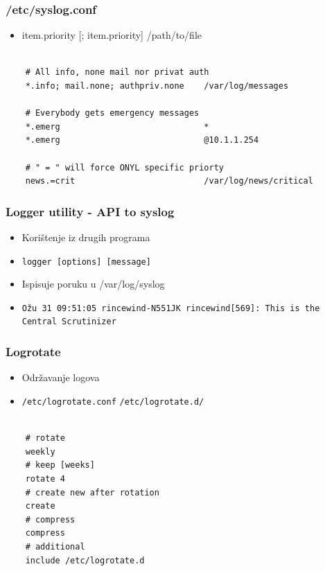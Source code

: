 \documentclass[t,table,usenames,dvipsnames]{beamer}
\newcommand{\shell}[1]{\texttt{#1}}
\begin{document}
\begin{frame}[fragile]
    \frametitle{/etc/syslog.conf}
    \begin{itemize}
        \item item.priority [; item.priority]   /path/to/file
    \end{itemize}
    \begin{verbatim}

    # All info, none mail nor privat auth
    *.info; mail.none; authpriv.none    /var/log/messages

    # Everybody gets emergency messages
    *.emerg                             *
    *.emerg                             @10.1.1.254
    
    # " = " will force ONYL specific priorty
    news.=crit                          /var/log/news/critical

    \end{verbatim}

\end{frame}

\begin{frame}[fragile]
    \frametitle{Logger utility - API to syslog}

    \begin{itemize}
        \item Korištenje iz drugih programa

        \item \shell{logger [options] [message]}
        \item Ispisuje poruku u /var/log/syslog

        \item \shell{Ožu 31 09:51:05 rincewind-N551JK rincewind[569]: This is the Central Scrutinizer}

    \end{itemize}

\end{frame}

\begin{frame}[fragile]
    \frametitle{Logrotate}
    \begin{itemize}
        \item Održavanje logova
        \item \shell{/etc/logrotate.conf} \shell{/etc/logrotate.d/}
    \end{itemize}

    \begin{verbatim}

    # rotate
    weekly
    # keep [weeks]
    rotate 4
    # create new after rotation
    create
    # compress
    compress
    # additional
    include /etc/logrotate.d

    \end{verbatim}

\end{frame}
\end{document}

